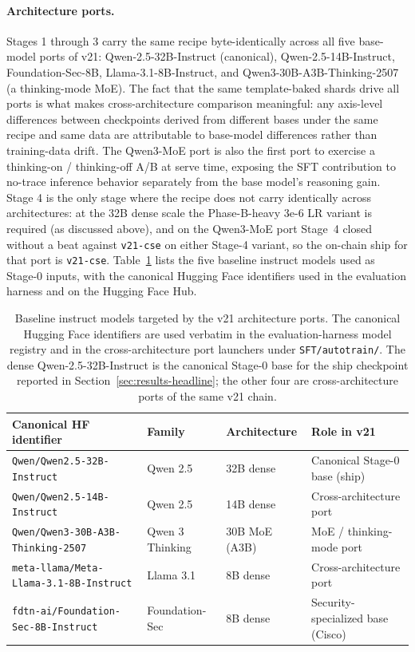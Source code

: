 \documentclass[webpdf,contemporary,large]{oup-authoring-template}
\providecommand{\hfid}[1]{{\small\nolinkurl{#1}}}
\theoremstyle{thmstyleone}
\theoremstyle{thmstyletwo}
\theoremstyle{thmstylethree}
\begin{document}
\paragraph{Architecture ports.}
Stages 1 through 3 carry the same recipe byte-identically across all five base-model ports of v21: Qwen-2.5-32B-Instruct (canonical), Qwen-2.5-14B-Instruct, Foundation-Sec-8B, Llama-3.1-8B-Instruct, and Qwen3-30B-A3B-Thinking-2507 (a thinking-mode MoE). The fact that the same template-baked shards drive all ports is what makes cross-architecture comparison meaningful: any axis-level differences between checkpoints derived from different bases under the same recipe and same data are attributable to base-model differences rather than training-data drift. The Qwen3-MoE port is also the first port to exercise a thinking-on / thinking-off A/B at serve time, exposing the SFT contribution to no-trace inference behavior separately from the base model's reasoning gain. Stage 4 is the only stage where the recipe does not carry identically across architectures: at the 32B dense scale the Phase-B-heavy 3e-6 LR variant is required (as discussed above), and on the Qwen3-MoE port Stage~4 closed without a beat against \hfid{v21-cse} on either Stage-4 variant, so the on-chain ship for that port is \hfid{v21-cse}. Table~\ref{tab:base-models} lists the five baseline instruct models used as Stage-0 inputs, with the canonical Hugging Face identifiers used in the evaluation harness and on the Hugging Face Hub.

\begin{table}[t]
\centering
\caption{Baseline instruct models targeted by the v21 architecture ports. The canonical Hugging Face identifiers are used verbatim in the evaluation-harness model registry and in the cross-architecture port launchers under \texorpdfstring{\hfid{SFT/autotrain/}}{SFT/autotrain/}. The dense Qwen-2.5-32B-Instruct is the canonical Stage-0 base for the ship checkpoint reported in Section~\ref{sec:results-headline}; the other four are cross-architecture ports of the same v21 chain.}
\label{tab:base-models}
\small
\setlength{\tabcolsep}{4pt}
\begin{tabular}{p{4.8cm} l l l}
\hline
\textbf{Canonical HF identifier} & \textbf{Family} & \textbf{Architecture} & \textbf{Role in v21} \\
\hline
\hfid{Qwen/Qwen2.5-32B-Instruct}             & Qwen 2.5             & 32B dense          & Canonical Stage-0 base (ship) \\
\hfid{Qwen/Qwen2.5-14B-Instruct}             & Qwen 2.5             & 14B dense          & Cross-architecture port \\
\hfid{Qwen/Qwen3-30B-A3B-Thinking-2507}      & Qwen 3 Thinking      & 30B MoE (A3B)      & MoE / thinking-mode port \\
\hfid{meta-llama/Meta-Llama-3.1-8B-Instruct} & Llama 3.1            & 8B dense           & Cross-architecture port \\
\hfid{fdtn-ai/Foundation-Sec-8B-Instruct}    & Foundation-Sec       & 8B dense           & Security-specialized base (Cisco) \\
\hline
\end{tabular}
\end{table}
\end{document}
